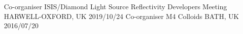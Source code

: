 \begin{cvhonors}
  \cvhonor
    {Co-organiser}
    {ISIS/Diamond Light Source Reflectivity Developers Meeting}
    {HARWELL-OXFORD, UK}
    {2019/10/24}
  \cvhonor
    {Co-organiser}
    {M4 Colloids}
    {BATH, UK}
    {2016/07/20}
\end{cvhonors}
